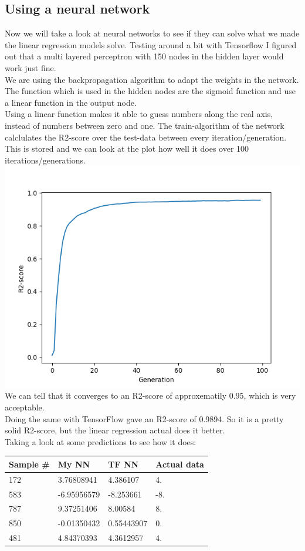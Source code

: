 \documentclass[a4paper,norsk]{article}
\begin{document}
\subsection{Using a neural network}
Now we will take a look at neural networks to see if they can solve what we made the linear regression models solve. Testing around a bit with Tensorflow I figured out that a multi layered perceptron with 150 nodes in the hidden layer would work just fine.\\
We are using the backpropagation algorithm to adapt the weights in the network.\\
The function which is used in the hidden nodes are the sigmoid function and use a linear function in the output node.\\
Using a linear function makes it able to guess numbers along the real axis, instead of numbers between zero and one.
The train-algorithm of the network calclulates the R2-score over the test-data between every iteration/generation. This is stored and we can look at the plot how well it does over 100 iterations/generations.\\
\includegraphics[scale=.7]{images/linearNN}\\
We can tell that it converges to an R2-score of approxematily 0.95, which is very acceptable.\\
Doing the same with TensorFlow gave an R2-score of 0.9894. So it is a pretty solid R2-score, but the linear regression actual does it better.\\
Taking a look at some predictions to see how it does:\\
\begin{center}
    \begin{tabular}{| l | l | l | l |}
    \hline
    Sample \# & My NN & TF NN & Actual data \\ \hline
    172 & 3.76808941 & 4.386107 & 4. \\ \hline
    583 & -6.95956579 & -8.253661 &-8. \\ \hline
    787 & 9.37251406 & 8.00584 &8. \\ \hline
    850 & -0.01350432 & 0.55443907 &0. \\ \hline
    481 & 4.84370393 & 4.3612957 &4. \\
    \hline
    \end{tabular}
\end{center}
\end{document}
